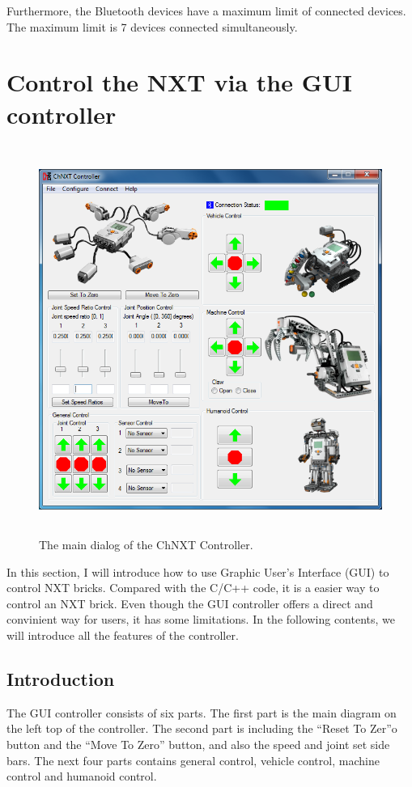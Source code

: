 \documentclass[11pt]{article}
\begin{document}
Furthermore, the Bluetooth devices have a maximum limit of connected devices. 
The maximum limit is 7 devices connected simultaneously.

\newpage
\section{Control the NXT via the GUI controller\label{sec:gui_controller}}
\begin{figure}[H]
  \begin{center}
    \includegraphics[height=5in]{figure/mindstorm/controlWithGUI.png}
    \caption{The main dialog of the ChNXT Controller.\label{fig:gui_control}}
  \end{center}
\end{figure}
In this section, I will introduce how to use Graphic User's Interface (GUI) to
control NXT bricks. Compared with the C/C++ code, it is a easier way to control
an NXT brick. Even though the GUI controller offers a direct and convinient way
for users, it has some limitations. In the following contents, we will introduce
all the features of the controller.

\subsection{Introduction \label{sec:gui_introduction}}
The GUI controller consists of six parts. The first part is the main diagram on
the left top of the controller. The second part is including the ``Reset To Zer''o
button and the ``Move To Zero'' button, and also the speed and joint set side bars.
The next four parts contains general control, vehicle control, machine control 
and humanoid control.
\end{document}

